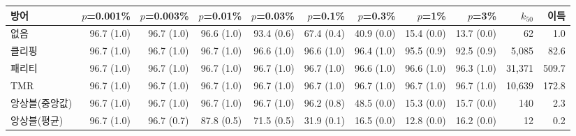 \setlength{\tabcolsep}{3pt}
\begin{tabular}{lrrrrrrrr|rr}
\toprule
방어 & $p$=0.001\% & $p$=0.003\% & $p$=0.01\% & $p$=0.03\% & $p$=0.1\% & $p$=0.3\% & $p$=1\% & $p$=3\% & $k_{50}$ & 이득 \\
\midrule
없음 & 96.7 (1.0) & 96.7 (1.0) & 96.6 (1.0) & 93.4 (0.6) & 67.4 (0.4) & 40.9 (0.0) & 15.4 (0.0) & 13.7 (0.0) & 62 & 1.0 \\
클리핑 & 96.7 (1.0) & 96.7 (1.0) & 96.7 (1.0) & 96.6 (1.0) & 96.6 (1.0) & 96.4 (1.0) & 95.5 (0.9) & 92.5 (0.9) & 5,085 & 82.6 \\
패리티 & 96.7 (1.0) & 96.7 (1.0) & 96.7 (1.0) & 96.7 (1.0) & 96.7 (1.0) & 96.6 (1.0) & 96.6 (1.0) & 96.3 (1.0) & 31,371 & 509.7 \\
TMR & 96.7 (1.0) & 96.7 (1.0) & 96.7 (1.0) & 96.7 (1.0) & 96.7 (1.0) & 96.7 (1.0) & 96.7 (1.0) & 96.7 (1.0) & 10,639 & 172.8 \\
앙상블(중앙값) & 96.7 (1.0) & 96.7 (1.0) & 96.7 (1.0) & 96.7 (1.0) & 96.2 (0.8) & 48.5 (0.0) & 15.3 (0.0) & 15.7 (0.0) & 140 & 2.3 \\
앙상블(평균) & 96.7 (1.0) & 96.7 (0.7) & 87.8 (0.5) & 71.5 (0.5) & 31.9 (0.1) & 16.5 (0.0) & 12.8 (0.0) & 16.2 (0.0) & 12 & 0.2 \\
\bottomrule
\end{tabular}
